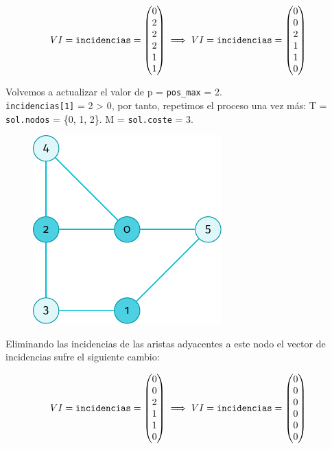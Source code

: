\documentclass[11pt]{article}
\begin{document}
$$ VI = \verb|incidencias| = 
\begin{pmatrix}
	0 \\
	2 \\
	2 \\
	2 \\
	1 \\
	1 
\end{pmatrix} \implies VI = \verb|incidencias| = 
\begin{pmatrix}
	0 \\
	0 \\
	2 \\
	1 \\
	1 \\
	0 
\end{pmatrix}$$

Volvemos a actualizar el valor de p = \verb|pos_max| = 2.\\
\verb|incidencias[1]| = 2 > 0, por tanto, repetimos el proceso una vez más: T  = \verb|sol.nodos| = \{0, 1, 2\}. 
M = \verb|sol.coste| = 3.

\begin{figure}[H]
	\centering \includegraphics{./img/grafo-ejemplo.pdf}
\end{figure}

Eliminando las incidencias de las aristas adyacentes a este nodo el vector de incidencias sufre el siguiente cambio:

 $$ VI = \verb|incidencias| = 
\begin{pmatrix}
	0 \\
	0 \\
	2 \\
	1 \\
	1 \\
	0  
\end{pmatrix} \implies VI = \verb|incidencias| = 
\begin{pmatrix}
	0 \\
	0 \\
	0 \\
	0 \\
	0 \\
	0 
\end{pmatrix}$$
\end{document}
